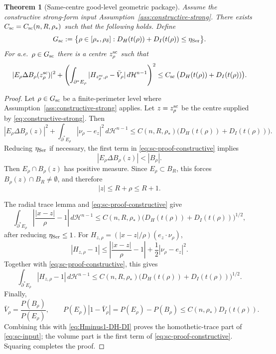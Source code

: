 \documentclass[11pt]{amsart}
\newtheorem{theorem}{Theorem}[section]
\theoremstyle{definition}
\newcommand{\rstar}{\rho_*}
\newcommand{\rdel}{\rho_\delta}
\newcommand{\Hn}{\mathcal H^{n-1}}
\newcommand{\Per}{P}
\begin{document}
\begin{theorem}[Same-centre good-level geometric package]
\label{inp:samecenter}
Assume the constructive strong-form input
Assumption~\ref{ass:constructive-strong}.  There exists
\(C_{\rm sc}=C_{\rm sc}(n,R,\rstar)\) such that the following holds.  Define
\[
   G_{\rm sc}:=\bigl\{\rho\in[\rstar,\rdel]:
      D_H(t(\rho))+D_I(t(\rho))\le\eta_{\rm Ser}\bigr\}.
\]
For a.e.\ \(\rho\in G_{\rm sc}\) there is a centre
\(z_\rho^{\rm sc}\) such that
\begin{equation}\label{eq:sc-input}
   |E_\rho\Delta B_\rho(z_\rho^{\rm sc})|^2
   +
   \left(
      \int_{\partial^*E_\rho}
         |H_{z_\rho^{\rm sc},\rho}-\bar V_\rho|\,d\Hn
   \right)^2
   \le C_{\rm sc}\,
      \bigl(D_H(t(\rho))+D_I(t(\rho))\bigr).
\end{equation}
\end{theorem}

\begin{proof}
Let \(\rho\in G_{\rm sc}\) be a finite-perimeter level where
Assumption~\ref{ass:constructive-strong} applies.  Let
\(z=z_\rho^{\rm sc}\) be the centre supplied by
\eqref{eq:constructive-strong}.  Then
\begin{equation}\label{eq:sc-proof-constructive}
   |E_\rho\Delta B_\rho(z)|^2
   +
   \int_{\partial^*E_\rho}|\nu_\rho-e_z|^2\,d\Hn
   \le C(n,R,\rstar)\bigl(D_H(t(\rho))+D_I(t(\rho))\bigr).
\end{equation}
Reducing \(\eta_{\rm Ser}\) if necessary, the first term in
\eqref{eq:sc-proof-constructive} implies
\[
   |E_\rho\Delta B_\rho(z)|<|B_\rho|.
\]
Then \(E_\rho\cap B_\rho(z)\) has positive measure.  Since
\(E_\rho\subset B_R\), this forces \(B_\rho(z)\cap B_R\ne\emptyset\), and
therefore
\begin{equation}\label{eq:sc-centre-localised}
   |z|\le R+\rho\le R+1 .
\end{equation}

The radial trace lemma and \eqref{eq:sc-proof-constructive} give
\[
   \int_{\partial^*E_\rho}
      \left|\frac{|x-z|}{\rho}-1\right|\,d\Hn
   \le
   C(n,R,\rstar)
   \bigl(D_H(t(\rho))+D_I(t(\rho))\bigr)^{1/2},
\]
after reducing \(\eta_{\rm Ser}\le1\).  For
\(H_{z,\rho}=(|x-z|/\rho)(e_z\cdot\nu_\rho)\),
\[
   |H_{z,\rho}-1|
   \le
   \left|\frac{|x-z|}{\rho}-1\right|
   +\frac12|\nu_\rho-e_z|^2 .
\]
Together with \eqref{eq:sc-proof-constructive}, this gives
\begin{equation}\label{eq:Hminus1-DH-DI}
   \int_{\partial^*E_\rho}|H_{z,\rho}-1|\,d\Hn
   \le
   C(n,R,\rstar)\bigl(D_H(t(\rho))+D_I(t(\rho))\bigr)^{1/2}.
\end{equation}
Finally,
\[
   \bar V_\rho=\frac{\Per(B_\rho)}{\Per(E_\rho)},\qquad
   \Per(E_\rho)|1-\bar V_\rho|
   =
   \Per(E_\rho)-\Per(B_\rho)
   \le C(n,\rstar)D_I(t(\rho)).
\]
Combining this with \eqref{eq:Hminus1-DH-DI} proves the homothetic-trace
part of \eqref{eq:sc-input}; the volume part is the first term of
\eqref{eq:sc-proof-constructive}.  Squaring completes the proof.
\end{proof}
\end{document}
